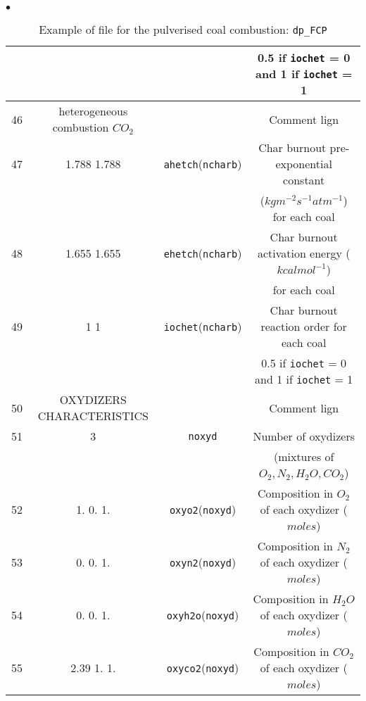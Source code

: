{{{\begin{list}{$\bullet$}{}
\begin{table}[htbp]
\begin{center}
{\begin{tabular}{|c|c|c|c|}
        &                                &                               & 0.5 if \texttt{iochet} = 0 and 1 if \texttt{iochet} = 1                \\ \hline
  46    &  heterogeneous combustion $CO_2$  &                               & Comment lign                               \\ \hline
  47    &      1.788        1.788        & \texttt{ahetch\index{ahetch}}(\texttt{ncharb})   & Char burnout pre-exponential constant                \\
        &                                &                               & ($kgm^{-2}s^{-1}atm^{-1}$) for each coal             \\ \hline
  48    &      1.655        1.655        & \texttt{ehetch\index{ehetch}}(\texttt{ncharb})   & Char burnout activation energy ($kcalmol^{-1}$)       \\
        &                                &                               & for each coal                                        \\ \hline
  49    &       1            1           & \texttt{iochet\index{iochet}}(\texttt{ncharb})   & Char burnout reaction order for each coal            \\
        &                                &                               & 0.5 if \texttt{iochet} = 0 and 1 if \texttt{iochet} = 1                \\ \hline
  50    &    OXYDIZERS CHARACTERISTICS   &                               & Comment lign                               \\ \hline
  51    &              3                 & \texttt{noxyd\index{noxyd}}    & Number of oxydizers  \\
        &                                &                               & (mixtures of $O_2,N_2,H_2O,CO_2$) \\ \hline
  52    &    1.        0.        1.      & \texttt{oxyo2\index{oxyo2}}(\texttt{noxyd})   & Composition in $O_2$ of each oxydizer ($moles$) \\
  53    &    0.        0.        1.      & \texttt{oxyn2\index{oxyn2}}(\texttt{noxyd})   & Composition in $N_2$ of each oxydizer ($moles$) \\
  54    &    0.        0.        1.      & \texttt{oxyh2o\index{oxyh2o}}(\texttt{noxyd}) & Composition in $H_2O$ of each oxydizer ($moles$) \\
  55    &  2.39        1.        1.      & \texttt{oxyco2\index{oxyco2}}(\texttt{noxyd}) & Composition in $CO_2$ of each oxydizer ($moles$) \\ \hline
\end{tabular}
}
\caption{Example of file for the pulverised coal combustion:
 \texttt{dp\_FCP}}\label{tab_dpFCP}
\end{center}
\end{table}


\end{list}}}}
